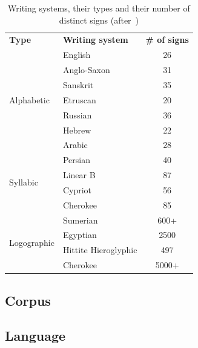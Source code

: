 \documentclass[../main.tex]{subfiles}
\begin{document}
\begin{table}[!ht]
    \centering
    \begin{tabular}{llc}
        \textbf{Type}                     & \textbf{Writing system} & \textbf{\# of signs} \\
        \multirow[t]{7}{6em}{Alphabetic}  & English                 & 26 \\
                                          & Anglo-Saxon             & 31 \\
                                          & Sanskrit                & 35 \\
                                          & Etruscan                & 20 \\
                                          & Russian                 & 36 \\
                                          & Hebrew                  & 22 \\
                                          & Arabic                  & 28 \\
        \multirow[t]{4}{6em}{Syllabic}    & Persian                 & 40 \\
                                          & Linear B                & 87 \\
                                          & Cypriot                 & 56 \\
                                          & Cherokee                & 85 \\
        \multirow[t]{4}{6em}{Logographic} & Sumerian                & 600+ \\
                                          & Egyptian                & 2500 \\
                                          & Hittite Hieroglyphic    & 497 \\
                                          & Cherokee                & 5000+ \\
    \end{tabular}
    \caption{Writing systems, their types and their number of distinct signs 
             (after~\cite[43]{coe1992})}
    \label{table:terminology-writing-systems-comparison}
\end{table}

\subsection{Corpus}

\subsection{Language}
\end{document}
